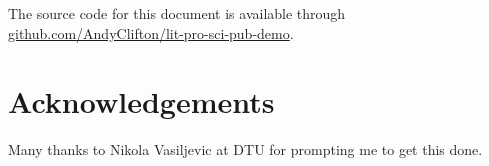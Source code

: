 \documentclass[11pt,]{article}
\begin{document}
The source code for this document is available through \href{https://github.com/AndyClifton/lit-pro-sci-pub-demo}{github.com/AndyClifton/lit-pro-sci-pub-demo}.

\hypertarget{acknowledgements}{%
\section*{Acknowledgements}\label{acknowledgements}}

Many thanks to Nikola Vasiljevic at DTU for prompting me to get this done.

\renewcommand\refname{Bibliography}

\end{document}
